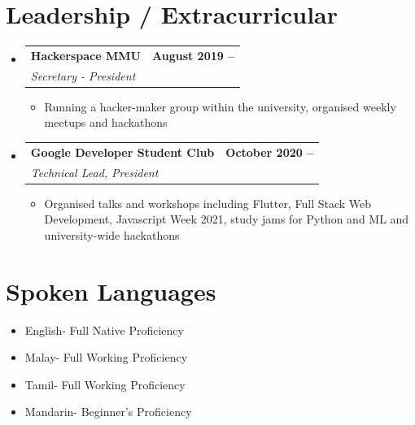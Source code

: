 \documentclass[letterpaper,12pt]{article}
\makeatletter
\newcommand{\resumeItem}[1]{
  \item\small{
    {#1 \vspace{-2pt}}
  }
}
\newcommand{\resumeSubheading}[4]{
  \vspace{-2pt}\item
    \begin{tabular*}{1.0\textwidth}[t]{l@{\extracolsep{\fill}}r}
      \textbf{#1} & \textbf{\small #2} \\
      \textit{\small#3} & \textit{\small #4} \\
    \end{tabular*}\vspace{-7pt}
}
\newcommand{\resumeSubHeadingListStart}{\begin{itemize}[leftmargin=0.0in, label={}]}
\newcommand{\resumeSubHeadingListEnd}{\end{itemize}}
\newcommand{\resumeItemListStart}{\begin{itemize}}
\newcommand{\resumeItemListEnd}{\end{itemize}\vspace{-5pt}}
\makeatother
\begin{document}
\section{Leadership / Extracurricular}
    \resumeSubHeadingListStart
        \resumeSubheading{Hackerspace MMU}{August 2019 --}{Secretary - President}{}
            \resumeItemListStart
                \resumeItem{Running a hacker-maker group within the university, organised weekly meetups and hackathons}
            \resumeItemListEnd
        \resumeSubheading{Google Developer Student Club}{October 2020 -- }{Technical Lead, President}{}
            \resumeItemListStart
                \resumeItem{Organised talks and workshops including Flutter, Full Stack Web Development, Javascript Week 2021, study jams for Python and ML and university-wide hackathons}
            \resumeItemListEnd
    \resumeSubHeadingListEnd

    \section{Spoken Languages}
    \resumeItemListStart
        \resumeItem{English- Full Native Proficiency}
        \resumeItem{Malay- Full Working Proficiency}
        \resumeItem{Tamil- Full Working Proficiency}
        \resumeItem{Mandarin- Beginner's Proficiency}
    \resumeItemListEnd
\end{document}
